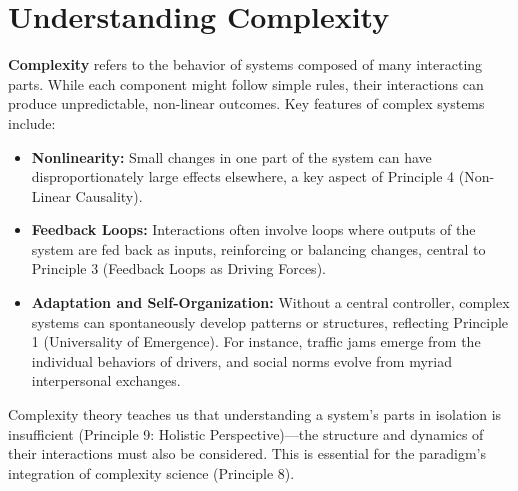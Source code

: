 \documentclass[12pt,openany]{book}
\begin{document}
\section*{Understanding Complexity}
\textbf{Complexity} refers to the behavior of systems composed of many interacting parts. While each component might follow simple rules, their interactions can produce unpredictable, non-linear outcomes. Key features of complex systems include:
\begin{itemize}
    \item \textbf{Nonlinearity:} Small changes in one part of the system can have disproportionately large effects elsewhere, a key aspect of Principle 4 (Non-Linear Causality).
    \item \textbf{Feedback Loops:} Interactions often involve loops where outputs of the system are fed back as inputs, reinforcing or balancing changes, central to Principle 3 (Feedback Loops as Driving Forces).
    \item \textbf{Adaptation and Self-Organization:} Without a central controller, complex systems can spontaneously develop patterns or structures, reflecting Principle 1 (Universality of Emergence). For instance, traffic jams emerge from the individual behaviors of drivers, and social norms evolve from myriad interpersonal exchanges.
\end{itemize}
Complexity theory teaches us that understanding a system's parts in isolation is insufficient (Principle 9: Holistic Perspective)---the structure and dynamics of their interactions must also be considered. This is essential for the paradigm's integration of complexity science (Principle 8). %
\end{document}

